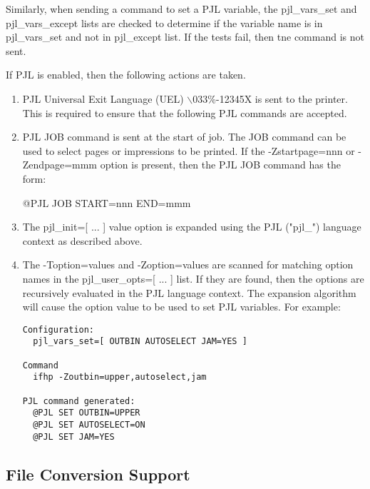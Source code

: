 \documentclass[a4paper]{article}
\begin{document}
Similarly,
when sending a command to set a PJL variable,
the
{\ttfamily pjl\_vars\_set}
and
{\ttfamily pjl\_vars\_except}
lists are checked to determine if the variable name is in
{\ttfamily pjl\_vars\_set}
and not in
{\ttfamily pjl\_except}
list.
If the tests fail, then tne command is not sent.

If PJL is enabled,
then the following actions are taken.
\begin{enumerate}
\item  PJL Universal Exit Language (UEL) {\ttfamily $\backslash$033\%-12345X} is sent to the printer.
This is required to ensure that the following PJL commands are
accepted.

\item  PJL JOB command is sent at the start of job.
The JOB command can be used to select pages or impressions to be printed.
If the
{\ttfamily -Zstartpage=nnn}
or
{\ttfamily -Zendpage=mmm}
option is present, then the PJL JOB command has the form:
\begin{tscreen}
@PJL JOB START=nnn END=mmm
\end{tscreen}
\item  The
{\ttfamily pjl\_init={[} ... {]}}
value option is expanded using the PJL
({\ttfamily "pjl\_"}) language context as described above.
\item  The
{\ttfamily -Toption=value}s
and
{\ttfamily -Zoption=value}s
are scanned for matching option names in the 
{\ttfamily pjl\_user\_opts={[} ... {]}} 
list.
If they are found,
then the options are recursively evaluated in the PJL language context.
The expansion algorithm will cause the option value to be used to set PJL
variables.
For example:
\begin{tscreen}
\begin{verbatim}
Configuration:
  pjl_vars_set=[ OUTBIN AUTOSELECT JAM=YES ]

Command
  ifhp -Zoutbin=upper,autoselect,jam

PJL command generated:
  @PJL SET OUTBIN=UPPER
  @PJL SET AUTOSELECT=ON
  @PJL SET JAM=YES
\end{verbatim}
\end{tscreen}
\end{enumerate}



\subsection{File Conversion Support
\label{fileconversion}
\label{textfile}
\label{default_language}}
\end{document}
